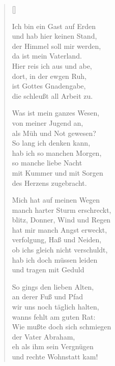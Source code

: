 \begin{multicols}{2}
\settowidth{\versewidth}{Ich bin ein Gast auf Erden}
\begin{verse}[\versewidth]

 Ich bin ein Gast auf Erden\\
und hab hier keinen Stand,\\
der Himmel soll mir werden,\\
da ist mein Vaterland.\\
Hier reis ich aus und abe,\\
dort, in der ewgen Ruh,\\
ist Gottes Gnadengabe,\\
die schleußt all Arbeit zu.

 Was ist mein ganzes Wesen,\\
von meiner Jugend an,\\
als Müh und Not gewesen?\\
So lang ich denken kann,\\
hab ich so manchen Morgen,\\
so manche liebe Nacht\\
mit Kummer und mit Sorgen\\
des Herzens zugebracht.

 Mich hat auf meinen Wegen\\
manch harter Sturm erschreckt,\\
blitz, Donner, Wind und Regen\\
hat mir manch Angst erweckt,\\
verfolgung, Haß und Neiden,\\
ob ichs gleich nicht verschuldt,\\
hab ich doch müssen leiden\\
und tragen mit Geduld

 So gings den lieben Alten,\\
an derer Fuß und Pfad\\
wir uns noch täglich halten,\\
wanns fehlt am guten Rat:\\
Wie mußte doch sich schmiegen\\
der Vater Abraham,\\
eh als ihm sein Vergnügen\\
und rechte Wohnstatt kam!


\end{verse}
\end{multicols}
